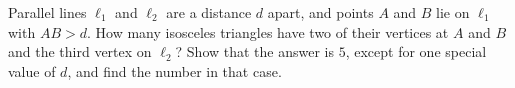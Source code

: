 Parallel lines $\ell_1$ and $\ell_2$ are a distance $d$ apart, and points $A$ and $B$ lie on $\ell_1$ with $AB>d$. How many isosceles triangles have two of their vertices at $A$ and $B$ and the third vertex on $\ell_2$? Show that the answer is $5$, except for one special value of $d$, and find the number in that case.

